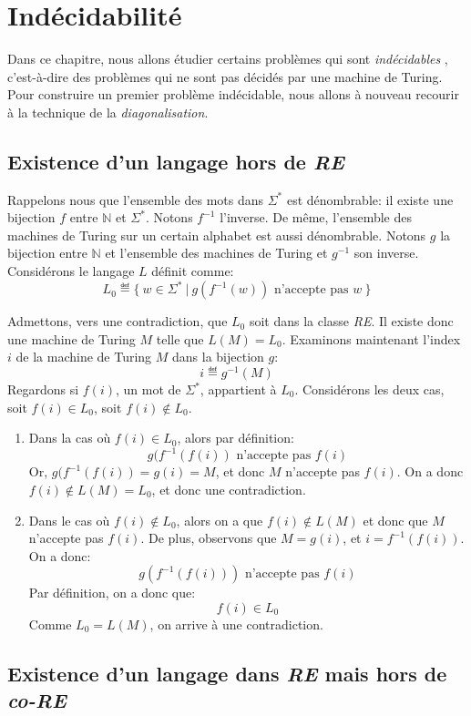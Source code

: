 \chapter{Indécidabilité}

Dans ce chapitre, nous allons étudier certains problèmes qui sont \og \textit{indécidables} \fg{}, c'est-à-dire des problèmes qui ne sont pas décidés par une machine de Turing.
Pour construire un premier problème indécidable, nous allons à nouveau recourir à la technique de la \textit{diagonalisation}.

\section{Existence d'un langage hors de \textit{RE}}

Rappelons nous que l'ensemble des mots dans $\Sigma^*$ est dénombrable: il existe une bijection $f$ entre $\mathbb{N}$ et $\Sigma^*$.
Notons $f^{-1}$ l'inverse.
De même, l'ensemble des machines de Turing sur un certain alphabet est aussi dénombrable.
Notons $g$ la bijection entre $\mathbb{N}$ et l'ensemble des machines de Turing et $g^{-1}$ son inverse.
Considérons le langage $L$ définit comme:
\[
L_0 \eqdef \{\ w \in \Sigma^*\ |\ g(f^{-1}(w))\text{ n'accepte pas }w\ \}
\]

Admettons, vers une contradiction, que $L_0$ soit dans la classe \textit{RE}.
Il existe donc une machine de Turing $M$ telle que $L(M) = L_0$.
Examinons maintenant l'index $i$ de la machine de Turing $M$ dans la bijection $g$:
\[
i \eqdef g^{-1}(M)
\]
Regardons si $f(i)$, un mot de $\Sigma^*$, appartient à $L_0$.
Considérons les deux cas, soit $f(i) \in L_0$, soit $f(i) \not\in L_0$.
\begin{enumerate}
\item Dans la cas où $f(i) \in L_0$, alors par définition:
\[
g(f^{-1}(f(i))\text{ n'accepte pas }f(i)
\]
Or, $g(f^{-1}(f(i)) = g(i) = M$, et donc $M$ n'accepte pas $f(i)$. On a donc $f(i) \not\in L(M) = L_0$, et donc une contradiction.
\item
Dans le cas où $f(i) \not\in L_0$, alors on a que $f(i) \not\in L(M)$ et donc que $M$ n'accepte pas $f(i)$.
De plus, observons que $M = g(i)$, et $i = f^{-1}(f(i))$. On a donc:
\[
g(f^{-1}(f(i))) \text{ n'accepte pas } f(i)
\]
Par définition, on a donc que:
\[
f(i) \in L_0
\]
Comme $L_0 = L(M)$, on arrive à une contradiction. 
\end{enumerate}

\section{Existence d'un langage dans \textit{RE} mais hors de \textit{co-RE}}

